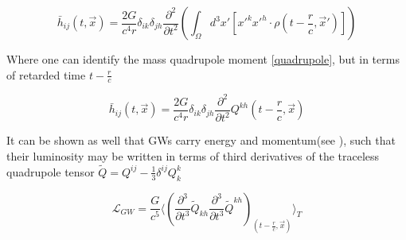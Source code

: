 \begin{equation}\label{source}
\bar{h}_{ij}(t, \vec{x}) = \frac{2 G}{c^4 r} \delta_{ik}  \delta_{jh}  \frac{\partial^2}{\partial t^2} \left(\int_{\Omega} d^3x' \left[ x'^k x'^h \cdot \rho\left(t-\frac{r}{c}, \vec{x}'\right)  \right] \right)
\end{equation}

Where one can identify the mass quadrupole moment \ref{quadrupole}, but in terms of retarded time $t-\frac{r}{c}$ 

\begin{equation}
\bar{h}_{ij}(t, \vec{x}) = \frac{2 G}{c^4 r} \delta_{ik}  \delta_{jh}  \frac{\partial^2}{\partial t^2} Q^{kh}\left(t-\frac{r}{c}, \vec{x}\right)
\end{equation}


It can be shown as well that GWs carry energy and momentum(see \cite{Maggiore:2007ulw}), such that their luminosity may be written in terms of third derivatives of the traceless quadrupole tensor $\tilde{Q} = Q^{ij} -  \frac{1}{3} \delta^{ij}Q^k_k$

\begin{equation}
\mathcal{L}_{GW} = \frac{G}{c^5} \Bigg\langle \left( \frac{\partial^3}{\partial t^3} \tilde{Q}_{kh} \frac{\partial^3}{\partial t^3} \tilde{Q}^{kh}\right)_{\left(t-\frac{r}{c}, \vec{x}\right)} \Bigg\rangle_T
\end{equation}
